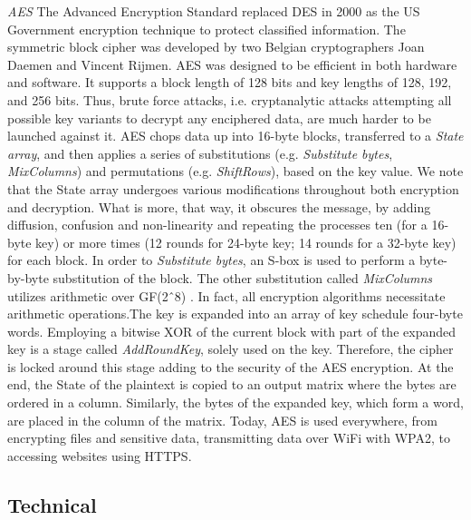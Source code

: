 \textit{AES} The Advanced Encryption Standard replaced DES in 2000 as the US Government encryption technique to protect classified information. The symmetric block cipher was developed by two Belgian cryptographers Joan Daemen and Vincent Rijmen. AES was designed to be efficient in both hardware and software. It supports a block length of 128 bits and key lengths of 128, 192, and 256 bits. Thus, brute force attacks, i.e. cryptanalytic attacks attempting all possible key variants to decrypt any enciphered data, are much harder to be launched against it. AES chops data up into 16-byte blocks, transferred to a \emph{State array}, and then applies a series of substitutions (e.g. \emph{Substitute bytes}, \emph{MixColumns}) and permutations (e.g. \emph{ShiftRows}), based on the key value. We note that the State array undergoes various modifications throughout both encryption and decryption. What is more, that way, it obscures the message, by adding diffusion, confusion and non-linearity and repeating the processes ten (for a 16-byte key) or more times (12 rounds for 24-byte key; 14 rounds for a 32-byte key) for each block. In order to \emph{Substitute bytes}, an S-box is used to perform a byte-by-byte substitution of the block. The other substitution called \emph{MixColumns} utilizes arithmetic over GF(2ˆ8) \cite{stallings2017-a}. In fact, all encryption algorithms necessitate arithmetic operations.The key is expanded into an array of key schedule four-byte words. Employing a bitwise XOR of the current block with part of the expanded key is a stage called \emph{AddRoundKey}, solely used on the key. Therefore, the cipher is locked around this stage adding to the security of the AES encryption.  At the end, the State of the plaintext is copied to an output matrix where the bytes are ordered in a column. Similarly, the bytes of the expanded key, which form a word, are placed in the column of the matrix. Today, AES is used everywhere, from encrypting files and sensitive data, transmitting data over WiFi with WPA2, to accessing websites using HTTPS. 

\subsection{Technical}